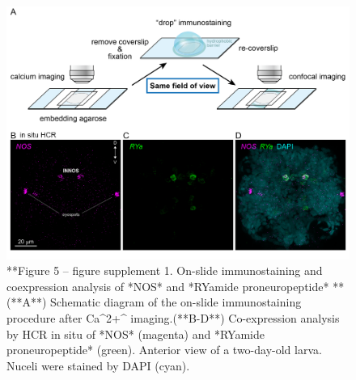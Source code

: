 \documentclass[
  10pt,
  onecolumn]{article}
\begin{document}
\begin{figure}
\includegraphics[width=27.78in]{figures/Fig5_sup1} \caption{**Figure 5 -- figure supplement 1. On-slide immunostaining and coexpression analysis of *NOS* and *RYamide proneuropeptide* ** (**A**) Schematic diagram of the on-slide immunostaining procedure after Ca^2+^ imaging.(**B-D**) Co-expression analysis by HCR in situ of *NOS* (magenta) and *RYamide proneuropeptide* (green). Anterior view of a two-day-old larva. Nuceli were stained by DAPI (cyan). }\label{fig:unnamed-chunk-19}
\end{figure}
\end{document}

